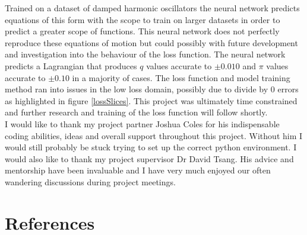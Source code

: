 \documentclass[10pt]{iopart}
\begin{document}
Trained on a dataset of damped harmonic oscillators the neural network predicts equations of this form with the scope to train on larger datasets in order to predict a greater scope of functions. This neural network does not perfectly reproduce these equations of motion but could possibly with future development and investigation into the behaviour of the loss function. The neural network predicts a Lagrangian that produces $q$ values accurate to $\pm 0.010$ and $\pi$ values accurate to $\pm 0.10$ in a majority of cases. The loss function and model training method ran into issues in the low loss domain, possibly due to divide by 0 errors as highlighted in figure \ref{lossSlices}. This project was ultimately time constrained and further research and training of the loss function will follow shortly. \\
\ack
I would like to thank my project partner Joshua Coles for his indispensable coding abilities, ideas and overall support throughout this project. Without him I would still probably be stuck trying to set up the correct python environment. I would also like to thank my project supervisor Dr David Tsang. His advice and mentorship have been invaluable and I have very much enjoyed our often wandering discussions during project meetings. 

\section*{References}


\end{document}
